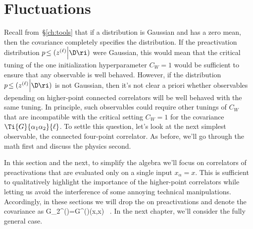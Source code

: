 \section{Fluctuations}\label{sec:fluctuations_DLN}
 
Recall from~\S\ref{ch:tools} that if a distribution 
is Gaussian and has a zero mean, then the covariance 
completely specifies the distribution. 
If the preactivation distribution $p\!\le(z^{(\ell)}\Big\vert\D \ri)$ were Gaussian, this would
mean that the critical tuning of the one initialization hyperparameter $C_W = 1$ would be sufficient to ensure that any observable is well behaved. However, if the distribution $p\!\le(z^{(\ell)}\Big\vert\D \ri)$ is not Gaussian, then it's not clear a priori whether observables depending on higher-point connected correlators will be well behaved with the same tuning. In principle, such observables could require other tunings of $C_W$ that are incompatible with the critical setting $C_W = 1$ for the covariance $\Ti{G}{\alpha_1\alpha_2}{\ell}$. To settle this question, let's look at the next simplest observable, the connected four-point correlator. As before, we'll go through the math first and discuss the physics second.

In this section and the next, to simplify the algebra we'll focus on correlators of preactivations that are evaluated only on a single input $x_{\alpha}=x$. This is sufficient to qualitatively highlight the importance of the higher-point correlators while letting us avoid the interference of some annoying technical manipulations.
Accordingly, in these sections we will drop the  on preactivations and  denote the covariance as
\be
G_{2}^{(\ell)}\equiv{}=G^{(\ell)}(x,x) \, .
\ee
In the next chapter, we'll consider the fully general case.

